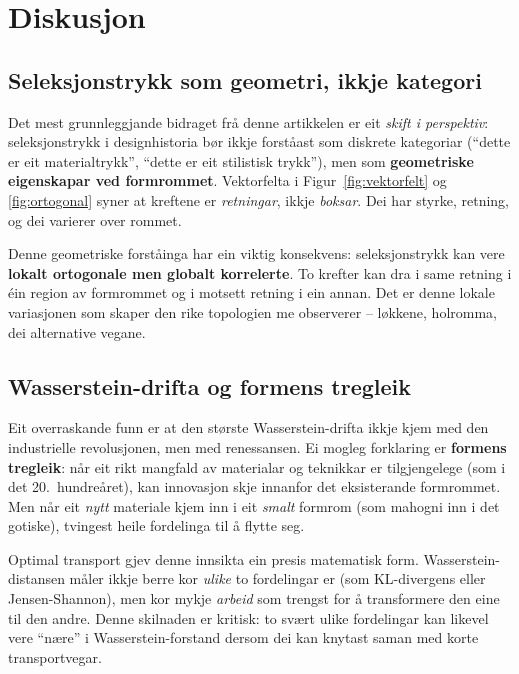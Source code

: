 \documentclass[10pt, a4paper, twocolumn]{article}
\begin{document}
\section{Diskusjon}
\label{sec:diskusjon}

\subsection{Seleksjonstrykk som geometri, ikkje kategori}

Det mest grunnleggjande bidraget fr\aa{} denne artikkelen er eit \emph{skift i perspektiv}: seleksjonstrykk i designhistoria b\o r ikkje forst\aa ast som diskrete kategoriar (``dette er eit materialtrykk'', ``dette er eit stilistisk trykk''), men som \textbf{geometriske eigenskapar ved formrommet}. Vektorfelta i Figur~\ref{fig:vektorfelt} og \ref{fig:ortogonal} syner at kreftene er \emph{retningar}, ikkje \emph{boksar}. Dei har styrke, retning, og dei varierer over rommet.

Denne geometriske forst\aa inga har ein viktig konsekvens: seleksjonstrykk kan vere \textbf{lokalt ortogonale men globalt korrelerte}. To krefter kan dra i same retning i \'{e}in region av formrommet og i motsett retning i ein annan. Det er denne lokale variasjonen som skaper den rike topologien me observerer -- l\o kkene, holromma, dei alternative vegane.

\subsection{Wasserstein-drifta og formens tregleik}

Eit overraskande funn er at den st\o rste Wasserstein-drifta ikkje kjem med den industrielle revolusjonen, men med renessansen. Ei mogleg forklaring er \textbf{formens tregleik}: n\aa r eit rikt mangfald av materialar og teknikkar er tilgjengelege (som i det 20.\ hundre\aa ret), kan innovasjon skje innanfor det eksisterande formrommet. Men n\aa r eit \emph{nytt} materiale kjem inn i eit \emph{smalt} formrom (som mahogni inn i det gotiske), tvingest heile fordelinga til \aa{} flytte seg.

Optimal transport gjev denne innsikta ein presis matematisk form. Wasserstein-distansen m\aa ler ikkje berre kor \emph{ulike} to fordelingar er (som KL-divergens eller Jensen-Shannon), men kor mykje \emph{arbeid} som trengst for \aa{} transformere den eine til den andre. Denne skilnaden er kritisk: to svært ulike fordelingar kan likevel vere ``n\ae re'' i Wasserstein-forstand dersom dei kan knytast saman med korte transportvegar.
\end{document}
